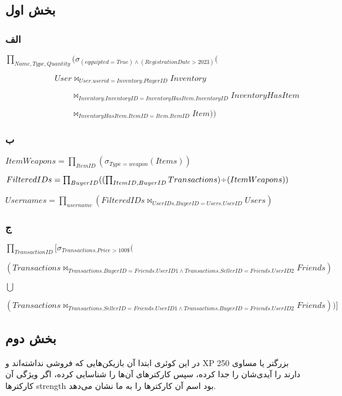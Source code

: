 \subsection*{بخش اول}

\subsubsection*{الف}

\setLTR
$\prod_{Name,Type,Quantity}(\sigma_{(eqquipted=True)\land(Registration Date > 2023)}($

 $\qquad \qquad \qquad User \bowtie_{User.userid=Inventory.PlayerID}Inventory$

 $\qquad \qquad \qquad \qquad  \bowtie_{Inventory.InventoryID = InventoryHasItem.InventoryID}InventoryHasItem$
 
 $\qquad \qquad \qquad \qquad  \bowtie_{InventoryHasItem.ItemID=Item.ItemID}Item))$
\setRTL

\subsubsection*{ب}

\setLTR
$ItemWeapons =\prod_{ItemID} (\sigma_{Type=weapon}(Items))$

$FilteredIDs = \prod_{BuyerID}((\prod_{ItemID,BuyerID}Transactions) \text{\textdiv} (ItemWeapons))$

$Usernames =\prod_{username} (FilteredIDs \bowtie_{UserIDs.BuyerID = Users.UserID} Users)$
\setRTL

\subsubsection*{ج}

\setLTR
$\prod_{TransactionID}[\sigma_{Transactions.Price>100\$}($

$(Transactions\bowtie_{Transactions.BuyerID=Friends.UserID1 \land Transactions.SellerID=Friends.UserID2}Friends)$

$\bigcup$

$(Transactions\bowtie_{Transactions.SellerID=Friends.UserID1 \land Transactions.BuyerID=Friends.UserID2}Friends))]$

\setRTL
	
\subsection*{بخش دوم}

در این کوئری ابتدا آن بازیکن‌هایی که فروشی نداشته‌اند و XP بزرگتر یا مساوی 250 دارند را آیدی‌شان را جدا کرده، سپس کارکترهای آن‌ها را شناسایی کرده، اگر ویژگی آن کارکترها strength بود اسم آن‌ کارکترها را به ما نشان می‌دهد.

